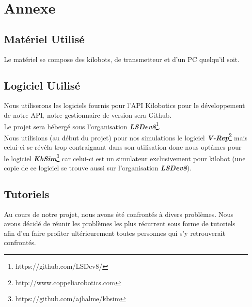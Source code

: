 \documentclass[a4paper,8pt]{report}
\begin{document}
\chapter{Annexe}

\section*{Mat\'eriel Utilis\'e}\label{sec:name}

Le mat\'eriel se compose des kilobots, de transmetteur et d'un PC quelqu'il soit.

\section*{Logiciel Utilis\'e}\label{sec:name}

Nous utiliserons les logiciels fournis pour l'API Kilobotics pour le d\'eveloppement de notre API, notre gestionnaire de version sera Github.\\
Le projet sera h\'eberg\'e sous l'organisation \textit{\textbf{LSDev8}}\footnote{https://github.com/LSDev8/}.\\
Nous utilisions (au d\'ebut du projet) pour nos simulations le logiciel \textit{\textbf{V-Rep}}\footnote{http://www.coppeliarobotics.com} mais celui-ci se r\'ev\'ela trop contraignant dans son utilisation donc nous opt\^ames pour le logiciel \textit{\textbf{KbSim}}\footnote{https://github.com/ajhalme/kbsim} car celui-ci est un simulateur exclusivement pour kilobot (une copie de ce logiciel se trouve aussi sur l'organisation \textit{\textbf{LSDev8}}).\\


\section*{Tutoriels}\label{sec:name}

Au cours de notre projet, nous avons été confrontés à divers problèmes. Nous avons décidé de réunir les probl\`emes les plus r\'ecurrent sous forme de tutoriels afin d'en faire profiter ultérieurement toutes personnes qui s'y retrouverait confrontés.
\end{document}

